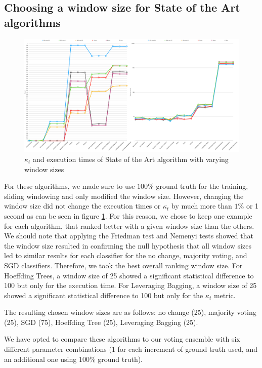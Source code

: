 \subsection{Choosing a window size for State of the Art algorithms}

\begin{figure}
  \includegraphics[width=\linewidth]{./images/chapter5/compare_sota}
\caption{\label{fig:raw_compare_sota}$\kappa_t$ and execution times of State of the Art algorithm with varying window sizes}
\end{figure}

For these algorithms, we made sure to use $100\%$ ground truth for the training, sliding windowing and only modified the window size. However, changing the window size did not change the execution times or $\kappa_t$ by much more than $1\%$ or 1 second as can be seen in figure \ref{fig:raw_compare_sota}. For this reason, we chose to keep one example for each algorithm, that ranked better with a given window size than the others. We should note that applying the Friedman test and Nemenyi tests showed that the window size resulted in confirming the null hypothesis that all window sizes led to similar results for each classifier for the no change, majority voting, and SGD classifiers. Therefore, we took the best overall ranking window size. For Hoeffding Trees, a window size of 25 showed a significant statistical difference to 100 but only for the execution time. For Leveraging Bagging, a window size of 25 showed a significant statistical difference to 100 but only for the $\kappa_t$ metric.

The resulting chosen window sizes are as follows: no change (25),  majority voting (25), SGD (75), Hoeffding Tree (25), Leveraging Bagging (25).

We have opted to compare these algorithms to our voting ensemble with six different parameter combinations (1 for each increment of ground truth used, and an additional one using $100\%$ ground truth).


